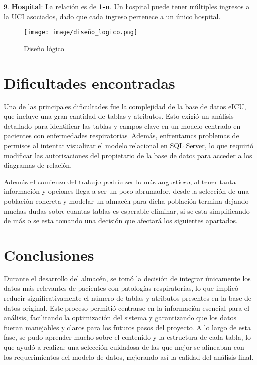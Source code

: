 \documentclass[12pt, a4paper, twoside]{article}
\begin{document}
	9. \textbf{Hospital}: La relación es de \textbf{1-n}. Un hospital puede tener múltiples ingresos a la UCI asociados, dado que cada ingreso pertenece a un único hospital.
	
	
	
	\begin{figure}[h!]
		\centering
		\texttt{[image: image/diseño\_logico.png]}
		\caption{Diseño lógico}
		\label{fig:11}
	\end{figure}
	
	

	
	
	
	
	\section{Dificultades encontradas}
	
	
	Una de las principales dificultades fue la complejidad de la base de datos eICU, que incluye una gran cantidad de tablas y atributos. Esto exigió un análisis detallado para identificar las tablas y campos clave en un modelo centrado en pacientes con enfermedades respiratorias. Además, enfrentamos problemas de permisos al intentar visualizar el modelo relacional en SQL Server, lo que requirió modificar las autorizaciones del propietario de la base de datos para acceder a los diagramas de relación.
	
	Además el comienzo del trabajo podría ser lo más angustioso, al tener tanta información y opciones llega a ser un poco abrumador, desde la selección de una población concreta y modelar un almacén para dicha población termina dejando muchas dudas sobre cuantas tablas es esperable eliminar, si se esta simplificando de más o se esta tomando una decisión que afectará los siguientes apartados. 
	
	\section{Conclusiones}
	
	Durante el desarrollo del almacén, se tomó la decisión de integrar únicamente los datos más relevantes de pacientes con patologías respiratorias, lo que implicó reducir significativamente el número de tablas y atributos presentes en la base de datos original. Este proceso permitió centrarse en la información esencial para el análisis, facilitando la optimización del sistema y garantizando que los datos fueran manejables y claros para los futuros pasos del proyecto. A lo largo de esta fase, se pudo aprender mucho sobre el contenido y la estructura de cada tabla, lo que ayudó a realizar una selección cuidadosa de las que mejor se alineaban con los requerimientos del modelo de datos, mejorando así la calidad del análisis final.
	
\end{document}

